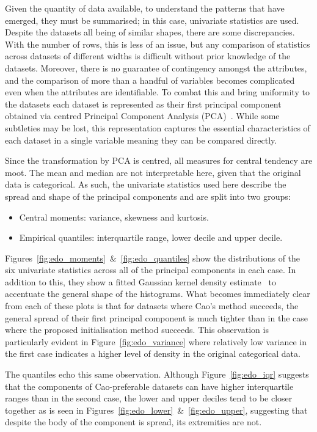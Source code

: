 Given the quantity of data available, to understand the patterns that have
emerged, they must be summarised; in this case, univariate statistics are used.
Despite the datasets all being of similar shapes, there are some discrepancies.
With the number of rows, this is less of an issue, but any comparison of
statistics across datasets of different widths is difficult without prior
knowledge of the datasets. Moreover, there is no guarantee of contingency
amongst the attributes, and the comparison of more than a handful of variables
becomes complicated even when the attributes are identifiable. To combat this
and bring uniformity to the datasets each dataset is represented as their first
principal component obtained via centred Principal Component Analysis
(PCA)~\cite{Jolliffe1986}. While some subtleties may be lost, this
representation captures the essential characteristics of each dataset in a
single variable meaning they can be compared directly.

Since the transformation by PCA is centred, all measures for central tendency
are moot. The mean and median are not interpretable here, given that the
original data is categorical. As such, the univariate statistics used here
describe the spread and shape of the principal components and are split into two
groups:
\begin{itemize}
    \item Central moments: variance, skewness and kurtosis.
    \item Empirical quantiles: interquartile range, lower decile and upper
        decile.
\end{itemize}

Figures~\ref{fig:edo_moments}~\&~\ref{fig:edo_quantiles} show the distributions
of the six univariate statistics across all of the principal components in each
case. In addition to this, they show a fitted Gaussian kernel density
estimate~\cite{Bashtannyk2001} to accentuate the general shape of the
histograms. What becomes immediately clear from each of these plots is that for
datasets where Cao's method succeeds, the general spread of their first
principal component is much tighter than in the case where the proposed
initialisation method succeeds. This observation is particularly evident in
Figure~\ref{fig:edo_variance} where relatively low variance in the first case
indicates a higher level of density in the original categorical data.

The quantiles echo this same observation. Although Figure~\ref{fig:edo_iqr}
suggests that the components of Cao-preferable datasets can have higher
interquartile ranges than in the second case, the lower and upper deciles tend
to be closer together as is seen in
Figures~\ref{fig:edo_lower}~\&~\ref{fig:edo_upper}, suggesting that despite the
body of the component is spread, its extremities are not.

